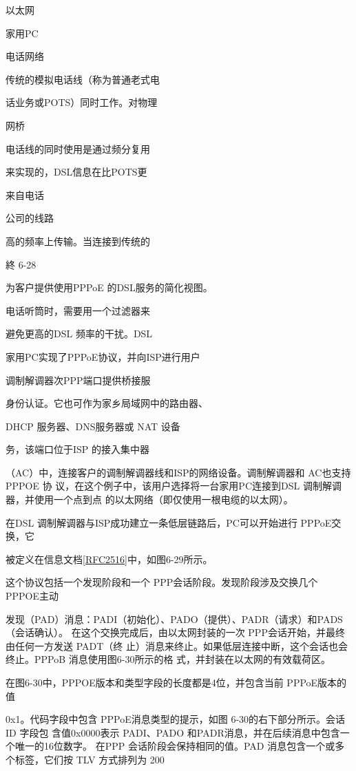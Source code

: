 以太网

家用PC

电话网络

传统的模拟电话线（称为普通老式电

话业务或POTS）同时工作。对物理

网桥

电话线的同时使用是通过频分复用

来实现的，DSL信息在比POTS更

来自电话

公司的线路

高的频率上传输。当连接到传统的

終 6-28

为客户提供使用PPPoE 的DSL服务的简化视图。

电话听筒时，需要用一个过滤器来

避免更高的DSL 频率的干扰。DSL

家用PC实现了PPPoE协议，并向ISP进行用户

调制解调器次PPP端口提供桥接服

身份认证。它也可作为家乡局域网中的路由器、

DHCP 服务器、DNS服务器或 NAT 设备

务，该端口位于ISP 的接入集中器

（AC）中，连接客户的调制解调器线和ISP的网络设备。调制解调器和 AC也支持PPPOE 协
议，在这个例子中，该用户选择将一台家用PC连接到DSL 调制解调器，并使用一个点到点
的以太网络（即仅使用一根电缆的以太网）。

在DSL 调制解调器与ISP成功建立一条低层链路后，PC可以开始进行 PPPoE交换，它

被定义在信息文档\href{https://www.rfc-editor.org/rfc/rfc2516}{\href{https://www.rfc-editor.org/rfc/rfc2516}{[RFC2516]}}中，如图6-29所示。

这个协议包括一个发现阶段和一个 PPP会话阶段。发现阶段涉及交换几个 PPPOE主动

发现（PAD）消息：PADI（初始化）、PADO（提供）、PADR（请求）和PADS（会话确认）。
在这个交换完成后，由以太网封装的一次 PPP会话开始，并最终由任何一方发送 PADT（终
止）消息来终止。如果低层连接中断，这个会话也会终止。PPPoB 消息使用图6-30所示的格
式，并封装在以太网的有效载荷区。

在图6-30中，PPPOE版本和类型字段的长度都是4位，并包含当前 PPPoE版本的值

0x1。代码字段中包含 PPPoE消息类型的提示，如图 6-30的右下部分所示。会话ID 字段包
含值0x0000表示 PADI、PADO 和PADR消息，并在后续消息中包含一个唯一的16位数字。
在PPP 会话阶段会保持相同的值。PAD 消息包含一个或多个标签，它们按 TLV 方式排列为
200

